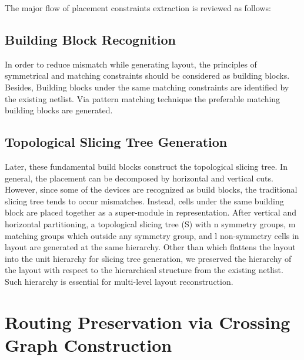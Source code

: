     The major flow of placement constraints extraction \cite{ALP_YPWeng_iccad2011} is reviewed as follows:
    \subsection{Building Block Recognition}
      In order to reduce mismatch while generating layout, the principles of symmetrical and matching constraints should be considered as building blocks. 
      Besides, Building blocks under the same matching constraints are identified by the existing netlist. Via pattern matching technique \cite{Massier_TCAD08} the preferable matching building blocks are generated.

    \subsection{Topological Slicing Tree Generation}
      Later, these fundamental build blocks construct the topological slicing tree. In general, the placement can be decomposed by horizontal and vertical cuts. However, since some of the devices are recognized as build blocks, the traditional slicing tree tends to occur mismatches. Instead, cells under the same building block are placed together as a super-module in representation. After vertical and horizontal  partitioning, a topological slicing tree (S) with n symmetry groups, m matching groups which outside any symmetry group, and l non-symmetry cells in layout are generated at the same hierarchy. Other than \cite{ALP_YPWeng_iccad2011} which flattens the layout into the unit hierarchy for slicing tree generation, we preserved the hierarchy of the layout with respect to the hierarchical structure from the existing netlist. Such hierarchy is essential for multi-level layout reconstruction. 




  \section{Routing Preservation via Crossing Graph Construction}\label{sec:CGC}


